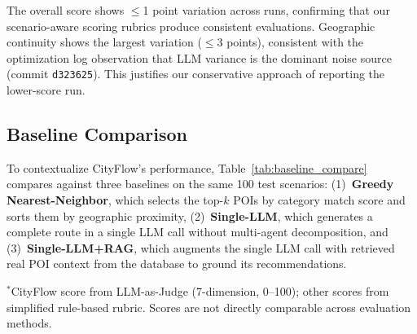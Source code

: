 The overall score shows $\leq$1 point variation across runs, confirming that our scenario-aware scoring rubrics produce consistent evaluations. Geographic continuity shows the largest variation ($\leq$3 points), consistent with the optimization log observation that LLM variance is the dominant noise source (commit \texttt{d323625}). This justifies our conservative approach of reporting the lower-score run.

\subsection{Baseline Comparison}
\label{sec:baseline_comparison}

To contextualize CityFlow's performance, Table~\ref{tab:baseline_compare} compares against three baselines on the same 100 test scenarios: (1)~\textbf{Greedy Nearest-Neighbor}, which selects the top-$k$ POIs by category match score and sorts them by geographic proximity, (2)~\textbf{Single-LLM}, which generates a complete route in a single LLM call without multi-agent decomposition, and (3)~\textbf{Single-LLM+RAG}, which augments the single LLM call with retrieved real POI context from the database to ground its recommendations.

\begin{table}[!t]
\centering
\caption{Baseline comparison on 100 test scenarios. ``Hallucination'' refers to POIs not present in the database. ``Diversity'' counts unique routes per scenario type.}
\label{tab:baseline_compare}
\vspace{2pt}
{\footnotesize $^{*}$CityFlow score from LLM-as-Judge (7-dimension, 0--100); other scores from simplified rule-based rubric. Scores are not directly comparable across evaluation methods.}
\end{table}

